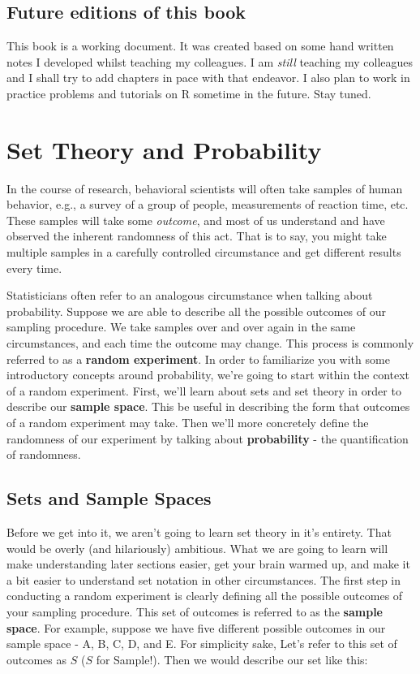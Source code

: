 \documentclass[
]{book}
\theoremstyle{definition}
\theoremstyle{definition}
\theoremstyle{definition}
\theoremstyle{definition}
\theoremstyle{remark}
\begin{document}
\section{Future editions of this book}\label{future-editions-of-this-book}

This book is a working document. It was created based on some hand written notes I developed whilst teaching my colleagues. I am \emph{still} teaching my colleagues and I shall try to add chapters in pace with that endeavor. I also plan to work in practice problems and tutorials on R sometime in the future. Stay tuned.

\chapter{Set Theory and Probability}\label{set-theory-and-probability}

In the course of research, behavioral scientists will often take samples of human behavior, e.g., a survey of a group of people, measurements of reaction time, etc. These samples will take some \emph{outcome}, and most of us understand and have observed the inherent randomness of this act. That is to say, you might take multiple samples in a carefully controlled circumstance and get different results every time.

Statisticians often refer to an analogous circumstance when talking about probability. Suppose we are able to describe all the possible outcomes of our sampling procedure. We take samples over and over again in the same circumstances, and each time the outcome may change. This process is commonly referred to as a \textbf{random experiment}. In order to familiarize you with some introductory concepts around probability, we're going to start within the context of a random experiment. First, we'll learn about sets and set theory in order to describe our \textbf{sample space}. This be useful in describing the form that outcomes of a random experiment may take. Then we'll more concretely define the randomness of our experiment by talking about \textbf{probability} - the quantification of randomness.

\section{Sets and Sample Spaces}\label{sets-and-sample-spaces}

Before we get into it, we aren't going to learn set theory in it's entirety. That would be overly (and hilariously) ambitious. What we are going to learn will make understanding later sections easier, get your brain warmed up, and make it a bit easier to understand set notation in other circumstances. The first step in conducting a random experiment is clearly defining all the possible outcomes of your sampling procedure. This set of outcomes is referred to as the \textbf{sample space}. For example, suppose we have five different possible outcomes in our sample space - A, B, C, D, and E. For simplicity sake, Let's refer to this set of outcomes as \(S\) (\(S\) for Sample!). Then we would describe our set like this:
\end{document}
